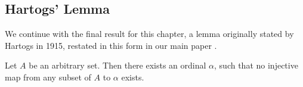 \documentclass[../../main.tex]{subfiles}
\begin{document}
\subsection*{Hartogs' Lemma}
We continue with the final result for this chapter, 
a lemma originally stated by Hartogs in 1915, restated in this form in our main paper \cite{Haj72}.

\begin{lemma}\cite{Har15}
    Let $A$ be an arbitrary set.
    Then there exists an ordinal $\alpha$, 
    such that no injective map from any subset of $A$ to $\alpha$ exists.
\end{lemma}
\end{document}
